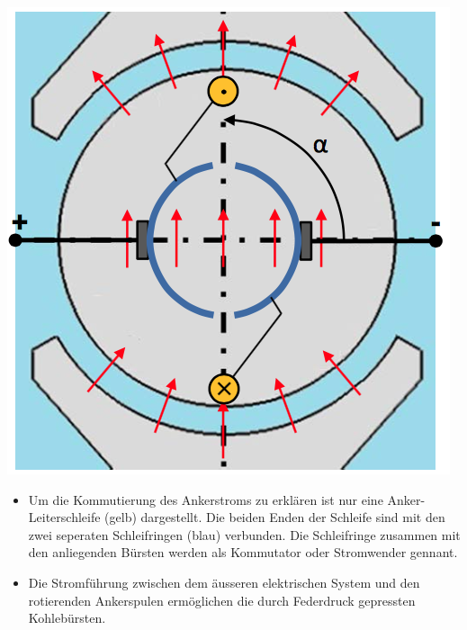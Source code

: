 \begin{minipage}{0.25 \linewidth}
\includegraphics[width = \linewidth]{./Pics/VL45/GSM2}
\end{minipage}
\begin{minipage}{0.7\linewidth}
\begin{itemize}
\item Um die Kommutierung des Ankerstroms zu erklären ist nur eine Anker-Leiterschleife (gelb) dargestellt. Die beiden Enden der Schleife sind mit den zwei seperaten Schleifringen (blau) verbunden. Die Schleifringe zusammen mit den anliegenden Bürsten werden als Kommutator oder Stromwender gennant.
\item Die Stromführung zwischen dem äusseren elektrischen System und den rotierenden Ankerspulen ermöglichen die durch Federdruck gepressten Kohlebürsten.
\end{itemize}
\end{minipage}


